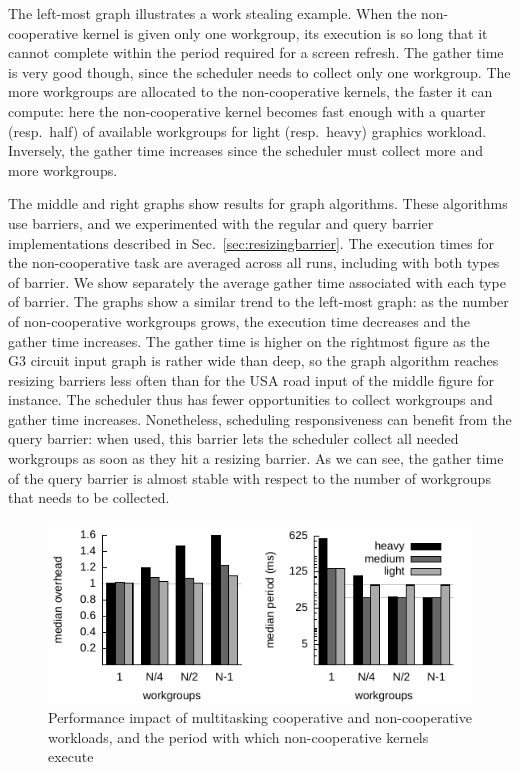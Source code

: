 \documentclass[sigconf]{acmart}
\newcommand{\mysec}{Sec.~}
\begin{document}
{The left-most graph illustrates a work
stealing example.  When the non-cooperative kernel is given only one
workgroup, its execution is so long that it cannot complete within the
period required for a screen refresh. The gather time is very good
though, since the scheduler needs to collect only one workgroup.  The
more workgroups are allocated to the non-cooperative kernels, the
faster it can compute: here the non-cooperative kernel becomes fast
enough with a quarter (resp.\ half) of available workgroups for light
(resp.\ heavy) graphics workload. Inversely, the gather time increases
since the scheduler must collect more and more workgroups.

The middle and right graphs show results for graph algorithms.  These
algorithms use barriers, and we experimented with the regular and
query barrier implementations described in
\mysec\ref{sec:resizingbarrier}.  The execution times for the
non-cooperative task are averaged across all runs, including with both
types of barrier.  We show separately the average gather time
associated with each type of barrier.  The graphs show a similar trend
to the left-most graph: as the number of non-cooperative workgroups
grows, the execution time decreases and the gather time
increases. %
%
The gather time is higher on the rightmost figure as the G3 circuit input
graph is rather wide than deep, so the graph algorithm reaches
resizing barriers less often than for the USA road input of the middle
figure for instance. The scheduler thus has fewer opportunities to
collect workgroups and gather time increases. Nonetheless, scheduling
responsiveness can benefit from the query barrier: when used, this
barrier lets the scheduler collect all needed workgroups as soon as
they hit a resizing barrier.
As we can see, the gather time of the
query barrier is almost stable with respect to the number of workgroups that
needs to be collected.


\begin{figure}
\includegraphics[width=\columnwidth]{heavy.pdf}
\caption{Performance impact of multitasking cooperative and non-cooperative workloads, and the period with which non-cooperative kernels execute}\label{fig:performance}
\end{figure}


}
\end{document}

